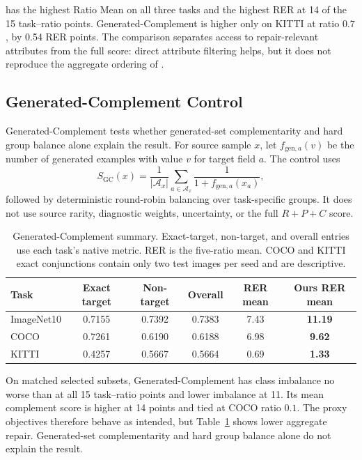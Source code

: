 \model has the highest Ratio Mean on all three tasks and the highest RER at 14 of the 15 task--ratio points. Generated-Complement is higher only on KITTI at ratio $0.7$, by 0.54 RER points. The comparison separates access to repair-relevant attributes from the full score: direct attribute filtering helps, but it does not reproduce the aggregate ordering of \model.

\subsection{Generated-Complement Control}

Generated-Complement tests whether generated-set complementarity and hard group balance alone explain the result. For source sample $x$, let $f_{\mathrm{gen},a}(v)$ be the number of generated examples with value $v$ for target field $a$. The control uses
\begin{equation}
S_{\mathrm{GC}}(x)=\frac{1}{|\mathcal A_x|}\sum_{a\in\mathcal A_x}\frac{1}{1+f_{\mathrm{gen},a}(x_a)},
\end{equation}
followed by deterministic round-robin balancing over task-specific groups. It does not use source rarity, diagnostic weights, uncertainty, or the full $R+P+C$ score.

\begin{table}[htbp]
\centering
\caption{Generated-Complement summary. Exact-target, non-target, and overall entries use each task's native metric. RER is the five-ratio mean. COCO and KITTI exact conjunctions contain only two test images per seed and are descriptive.}
\label{tab:generated-complement-summary}
\small
\setlength{\tabcolsep}{5pt}
\begin{tabular}{l c c c c c}
\toprule
\rowcolor{sectiongray} \textbf{Task} & \textbf{Exact target} & \textbf{Non-target} & \textbf{Overall} & \textbf{RER mean} & \textbf{Ours RER mean} \\
\midrule
ImageNet10 & 0.7155 & 0.7392 & 0.7383 & 7.43 & \textbf{11.19} \\
COCO & 0.7261 & 0.6190 & 0.6188 & 6.98 & \textbf{9.62} \\
KITTI & 0.4257 & 0.5667 & 0.5664 & 0.69 & \textbf{1.33} \\
\bottomrule
\end{tabular}
\end{table}

On matched selected subsets, Generated-Complement has class imbalance no worse than \model at all 15 task--ratio points and lower imbalance at 11. Its mean complement score is higher at 14 points and tied at COCO ratio $0.1$. The proxy objectives therefore behave as intended, but Table~\ref{tab:generated-complement-summary} shows lower aggregate repair. Generated-set complementarity and hard group balance alone do not explain the \model result.

